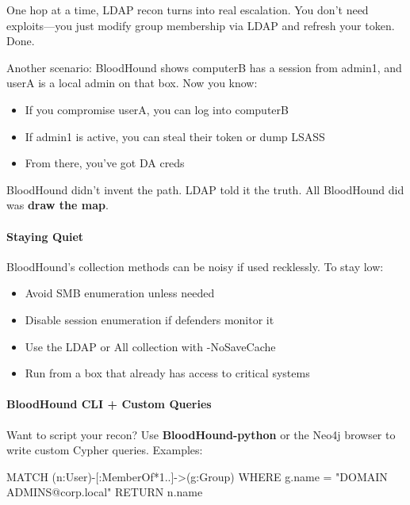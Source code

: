One hop at a time, LDAP recon turns into real escalation. You don’t need exploits—you just modify group membership via LDAP and refresh your token. Done.

Another scenario: BloodHound shows computerB has a session from admin1, and userA is a local admin on that box. Now you know:

\begin{itemize}
    \item If you compromise userA, you can log into computerB

    \item If admin1 is active, you can steal their token or dump LSASS

    \item From there, you’ve got DA creds

\end{itemize}
BloodHound didn’t invent the path. LDAP told it the truth. All BloodHound did was \textbf{draw the map}.

\paragraph{\textbf{   Staying Quiet}}

BloodHound’s collection methods can be noisy if used recklessly. To stay low:

\begin{itemize}
    \item Avoid SMB enumeration unless needed

    \item Disable session enumeration if defenders monitor it

    \item Use the LDAP or All collection with -NoSaveCache

    \item Run from a box that already has access to critical systems

\end{itemize}

\paragraph{\textbf{BloodHound CLI + Custom Queries}}

Want to script your recon? Use \textbf{BloodHound-python} or the Neo4j browser to write custom Cypher queries. Examples:

MATCH (n:User)-[:MemberOf*1..]->(g:Group) WHERE g.name = "DOMAIN ADMINS@corp.local" RETURN n.name

